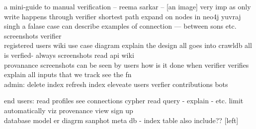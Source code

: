 a mini-guide to manual verification -- reema sarkar -- [an image]
very imp as only write happens through verifier
shortest path
expand on nodes in neo4j yuvraj singh a falase case can describe
examples of connection --- between sons etc. 
screenshots verifier \\
 

registered users
wiki
use case diagram
explain the design all goes into crawldb
all is verfied- always 
screenshots
read api
wiki \\


provanance
screenshots can be seen by users
how is it done
when verifier verifies
explain
all inputs that we track
see the fn \\

admin:
delete index
refresh index
eleveate users
verfier contributions
bots


end users:
read profiles
see connections
cypher read query - explain - etc.
limit automatically
viz
provenance view
sign up\\

database model er diagrm sanphot meta db - index table also include?? [left] \\